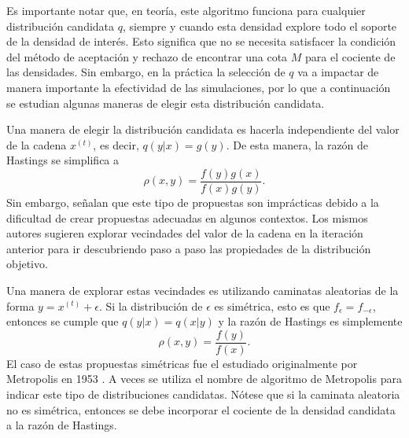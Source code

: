 \documentclass[11pt,a4paper]{article}
\begin{document}
Es importante notar que, en teoría, este algoritmo funciona para cualquier distribución candidata $q$, siempre y cuando esta densidad explore todo el soporte de la densidad de interés. Esto significa que no se necesita satisfacer la condición del método de aceptación y rechazo de encontrar una cota $M$ para el cociente de las densidades. Sin embargo, en la práctica la selección de $q$ va a impactar de manera importante la efectividad de las simulaciones, por lo que a continuación se estudian algunas maneras de elegir esta distribución candidata.

Una manera de elegir la distribución candidata es hacerla independiente del valor de la cadena $x^{(t)}$, es decir, $q(y|x) = g(y)$. De esta manera, la razón de Hastings se simplifica a $$\rho (x, y) = \frac{f(y)g(x)}{f(x)g(y)}.$$ Sin embargo, \citet{casella} señalan que este tipo de propuestas son imprácticas debido a la dificultad de crear propuestas adecuadas en algunos contextos. Los mismos autores sugieren explorar vecindades del valor de la cadena en la iteración anterior para ir descubriendo paso a paso las propiedades de la distribución objetivo.

Una manera de explorar estas vecindades es utilizando caminatas aleatorias de la forma $y = x^{(t)} + \epsilon$. Si la distribución de $\epsilon$ es simétrica, esto es que $f_{\epsilon} = f_{-\epsilon}$, entonces se cumple que $q(y|x) = q(x|y)$ y la razón de Hastings es simplemente $$\rho (x, y) = \frac{f(y)}{f(x)}.$$ El caso de estas propuestas simétricas fue el estudiado originalmente por Metropolis en 1953 \citep{gelman}. A veces se utiliza el nombre de algoritmo de Metropolis para indicar este tipo de distribuciones candidatas. Nótese que si la caminata aleatoria no es simétrica, entonces se debe incorporar el cociente de la densidad candidata a la razón de Hastings.
\end{document}
